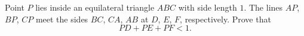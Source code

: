Point $P$ lies inside an equilateral triangle $ABC$ with side length $1$. The lines $AP$, $BP$, $CP$ meet the sides $BC$, $CA$, $AB$ at $D$, $E$, $F$, respectively. Prove that
\[PD+PE+PF<1.\]
